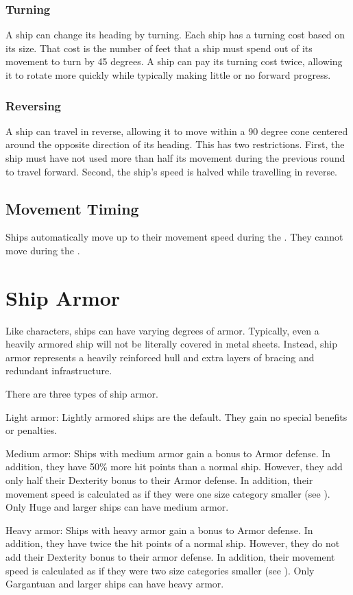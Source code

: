     \subsubsection{Turning}
      A ship can change its heading by turning.
      Each ship has a turning cost based on its size.
      That cost is the number of feet that a ship must spend out of its movement to turn by 45 degrees.
      A ship can pay its turning cost twice, allowing it to rotate more quickly while typically making little or no forward progress.

    \subsubsection{Reversing}
      A ship can travel in reverse, allowing it to move within a 90 degree cone centered around the opposite direction of its heading.
      This has two restrictions.
      First, the ship must have not used more than half its movement during the previous round to travel forward.
      Second, the ship's speed is halved while travelling in reverse.

  \subsection{Movement Timing}
    Ships automatically move up to their movement speed during the .
    They cannot move during the .

\section{Ship Armor}\label{Ship Armor}
  Like characters, ships can have varying degrees of armor.
  Typically, even a heavily armored ship will not be literally covered in metal sheets.
  Instead, ship armor represents a heavily reinforced hull and extra layers of bracing and redundant infrastructure.

  There are three types of ship armor.
  \begin{raggeditemize}
    \item Light armor: Lightly armored ships are the default. They gain no special benefits or penalties.
    \item Medium armor: Ships with medium armor gain a  bonus to Armor defense.
      In addition, they have 50\% more hit points than a normal ship.
      However, they add only half their Dexterity bonus to their Armor defense.
      In addition, their movement speed is calculated as if they were one size category smaller (see ).
      Only Huge and larger ships can have medium armor.
    \item Heavy armor: Ships with heavy armor gain a  bonus to Armor defense.
      In addition, they have twice the hit points of a normal ship.
      However, they do not add their Dexterity bonus to their armor defense.
      In addition, their movement speed is calculated as if they were two size categories smaller (see ).
      Only Gargantuan and larger ships can have heavy armor.
  \end{raggeditemize}

